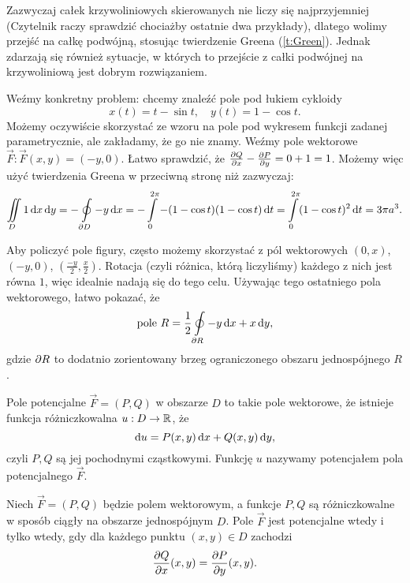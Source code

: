 \begin{remark}
    Zazwyczaj całek krzywoliniowych skierowanych nie liczy się najprzyjemniej (Czytelnik raczy sprawdzić chociażby ostatnie dwa przykłady), dlatego wolimy przejść na całkę podwójną, stosując twierdzenie Greena (\ref{t:Green}). Jednak zdarzają się również sytuacje, w których to przejście z całki podwójnej na krzywoliniową jest dobrym rozwiązaniem.

    Weźmy konkretny problem: chcemy znaleźć pole pod łukiem cykloidy
    \[ x(t) = t - \sin t, \quad y(t) = 1 - \cos t. \]
    Możemy oczywiście skorzystać ze wzoru na pole pod wykresem funkcji zadanej parametrycznie, ale zakładamy, że go nie znamy. Weźmy pole wektorowe $\vec{F} : \vec{F}(x, y) = (-y, 0)$. Łatwo sprawdzić, że $\frac{\operatorname{\partial}\!{Q}}{\operatorname{\partial}\!{x}} - \frac{\operatorname{\partial}\!{P}}{\operatorname{\partial}\!{y}} = 0 + 1 = 1$. Możemy więc użyć twierdzenia Greena w przeciwną stronę niż zazwyczaj:
    \[ \iint\limits_D 1 \operatorname{d}\!{x} \operatorname{d}\!{y} = -\oint\limits_{\operatorname{\partial}\!{D}} -y \operatorname{d}\!{x} = -\int\limits_0^{2\pi} -(1 - \cos t)(1 - \cos t) \operatorname{d}\!{t} = \int\limits_0^{2\pi} (1 - \cos t)^2 \operatorname{d}\!{t} = 3\pi a^3.\]

    Aby policzyć pole figury, często możemy skorzystać z pól wektorowych $(0, x)$, $(-y, 0)$, $\left(\frac{-y}{2}, \frac{x}{2}\right)$. Rotacja (czyli różnica, którą liczyliśmy) każdego z nich jest równa $1$, więc idealnie nadają się do tego celu. Używając tego ostatniego pola wektorowego, łatwo pokazać, że
    \begin{equation}
        \text{pole } R = \frac{1}{2}\oint\limits_{\operatorname{\partial}\!{R}} -y \operatorname{d}\!{x} + x \operatorname{d}\!{y},
    \end{equation}
    gdzie $\operatorname{\partial}\!{R}$ to dodatnio zorientowany brzeg ograniczonego obszaru jednospójnego $R$.
\end{remark}

\begin{definition}
    Pole potencjalne $\vec{F} = (P, Q)$ w obszarze $D$ to takie pole wektorowe, że istnieje funkcja różniczkowalna $u : D \to \mathbb R$, że
    \[ \operatorname{d}\!{u} = P(x, y) \operatorname{d}\!{x} + Q(x, y) \operatorname{d}\!{y}, \]
    czyli $P, Q$ są jej pochodnymi cząstkowymi. Funkcję $u$ nazywamy potencjałem pola potencjalnego $\vec{F}$.
\end{definition}

\begin{theorem}
    \label{t:necessary and sufficient condition for field potentiality}
    Niech $\vec{F} = (P, Q)$ będzie polem wektorowym, a funkcje $P, Q$ są różniczkowalne w sposób ciągły na obszarze jednospójnym $D$. Pole $\vec{F}$ jest potencjalne wtedy i tylko wtedy, gdy dla każdego punktu $(x, y) \in D$ zachodzi
    \[ \frac{\operatorname{\partial}\!{Q}}{\operatorname{\partial}\!{x}}(x, y) = \frac{\operatorname{\partial}\!{P}}{\operatorname{\partial}\!{y}}(x, y). \]
\end{theorem}

